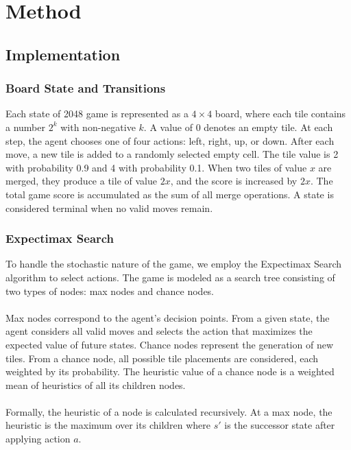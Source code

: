 \documentclass{article}
\begin{document}
\section{Method}

\subsection{Implementation}

\subsubsection{Board State and Transitions}

Each state of 2048 game is represented as a $4 \times 4$ board, where each tile contains a number $2^k$ with
non-negative $k$. A value of 0 denotes an empty tile. At each step, the agent chooses one of four actions:
left, right, up, or down. After each move, a new tile is added to a randomly selected empty cell.
The tile value is 2 with probability 0.9 and 4 with probability 0.1. When two tiles of value $x$ are merged,
they produce a tile of value $2x$, and the score is increased by $2x$. The total game score is accumulated
as the sum of all merge operations. A state is considered terminal when no valid moves remain.

\subsubsection{Expectimax Search}

To handle the stochastic nature of the game, we employ the Expectimax Search algorithm to select actions.
The game is modeled as a search tree consisting of two types of nodes: max nodes and chance nodes.
\\
\\
Max nodes correspond to the agent's decision points. From a given state, the agent considers all valid moves
and selects the action that maximizes the expected value of future states. Chance nodes represent the generation
of new tiles. From a chance node, all possible tile placements are considered, each weighted by its probability.
The heuristic value of a chance node is a weighted mean of heuristics of all its children nodes.
\\
\\
Formally, the heuristic of a node is calculated recursively. At a max node, the heuristic is the maximum over
its children where $s'$ is the successor state after applying action $a$.
\end{document}
